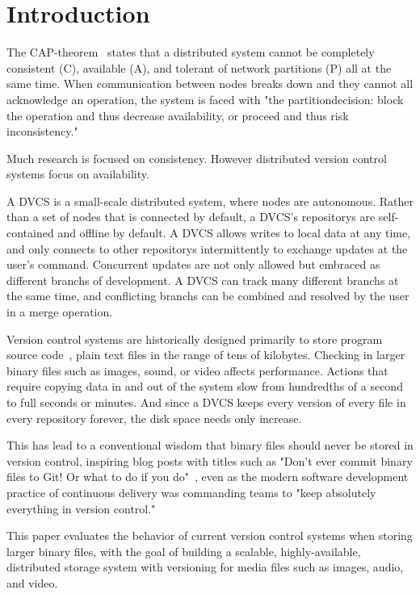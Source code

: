 \section{Introduction}

The \gls{CAP-theorem}~\cite{cap_origin} states that a distributed system cannot be completely consistent (C), available (A), and tolerant of network partitions (P) all at the same time.
When communication between nodes breaks down and they cannot all acknowledge an operation, the system is faced with "the \gls{partitiondecision}: block the operation and thus decrease availability, or proceed and thus risk inconsistency."~\cite{cap_years_later}

Much research is focused on consistency.
However distributed version control systems focus on availability.

A \gls{DVCS} is a small-scale distributed system, where nodes are autonomous.
Rather than a set of nodes that is connected by default, a \gls{DVCS}'s \glspl{repository} are self-contained and offline by default.
A DVCS allows writes to local data at any time, and only connects to other \glspl{repository} intermittently to exchange updates at the user's command.
Concurrent updates are not only allowed but embraced as different \glspl{branch} of development.
A \gls{DVCS} can track many different \glspl{branch} at the same time, and conflicting \glspl{branch} can be combined and resolved by the user in a \gls{merge} operation.

Version control systems are historically designed primarily to store program source code~\cite{history_of_version_control}, plain text files in the range of tens of kilobytes.
Checking in larger binary files such as images, sound, or video affects performance.
Actions that require copying data in and out of the system slow from hundredths of a second to full seconds or minutes.
And since a \gls{DVCS} keeps every version of every file in every \gls{repository} forever, the disk space needs only increase.

This has lead to a conventional wisdom that binary files should never be stored in version control, inspiring blog posts with titles such as
"Don't ever commit binary files to Git! Or what to do if you do"~\cite{dont_ever_commit_binaries_to_version_control},
even as the modern software development practice of continuous delivery was commanding teams to "keep absolutely everything in version control."~\cite[p.33]{continuousdeliverybook}

This paper evaluates the behavior of current version control systems when storing larger binary files, with the goal of building a scalable, highly-available, distributed storage system with versioning for media files such as images, audio, and video.
